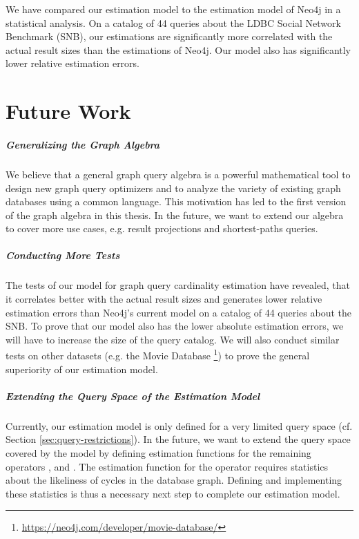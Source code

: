We have compared our estimation model to the estimation model of Neo4j
in a statistical analysis. On a catalog of 44 queries about the LDBC Social
Network Benchmark (SNB)\cite{erling_ldbc_2015}, our estimations are
significantly more correlated with the actual result sizes than the
estimations of Neo4j. Our model also has significantly lower relative
estimation errors.

\chapter{Future Work}

\paragraph{Generalizing the Graph Algebra}

We believe that a general graph query algebra is a powerful
mathematical tool to design new graph query optimizers and to analyze the variety
of existing graph databases using a common language.
This motivation has led to the first version of the graph algebra in this thesis.
In the future, we want to extend our algebra to cover more use cases,
e.g. result projections and shortest-paths queries.

\paragraph{Conducting More Tests}

The tests of our model for graph query cardinality estimation have revealed,
that it correlates better with the actual result sizes and generates lower relative
estimation errors than Neo4j's current model on a catalog
of 44 queries about the SNB.
To prove that our model also has the lower absolute estimation errors, we will have
to increase the size of the query catalog.
We will also conduct similar tests on other datasets (e.g. the Movie Database%
\footnote{\url{https://neo4j.com/developer/movie-database/}}) to prove the general
superiority of our estimation model.

\paragraph{Extending the Query Space of the Estimation Model}

Currently, our estimation model is only defined for
a very limited query space (cf. Section \ref{sec:query-restrictions}).
In the future, we want to extend the query space covered by the model by
defining estimation functions for the remaining operators ,
 and . The estimation function for the
 operator requires statistics about the likeliness of cycles in
the database graph. Defining and implementing these statistics is thus a
necessary next step to complete our estimation model.

